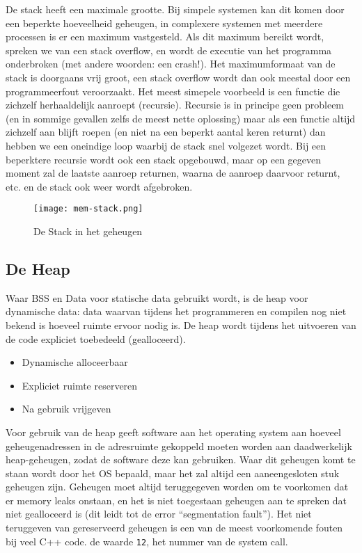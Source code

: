 De stack heeft een maximale grootte. Bij simpele systemen kan dit komen door een beperkte hoeveelheid geheugen, in complexere systemen met meerdere processen is er een maximum vastgesteld. Als dit maximum bereikt wordt, spreken we van een stack overflow, en wordt de executie van het programma onderbroken (met andere woorden: een crash!). Het maximumformaat van de stack is doorgaans vrij groot, een stack overflow wordt dan ook meestal door een programmeerfout veroorzaakt. Het meest simepele voorbeeld is een functie die zichzelf herhaaldelijk aanroept (recursie). Recursie is in principe geen probleem (en in sommige gevallen zelfs de meest nette oplossing) maar als een functie altijd zichzelf aan blijft roepen (en niet na een beperkt aantal keren returnt) dan hebben we een oneindige loop waarbij de stack snel volgezet wordt. Bij een beperktere recursie wordt ook een stack opgebouwd, maar op een gegeven moment zal de laatste aanroep returnen, waarna de aanroep daarvoor returnt, etc. en de stack ook weer wordt afgebroken.

\begin{figure}[ht]
    \centering
    \texttt{[image: mem-stack.png]}
    \caption{De Stack in het geheugen}
    \label{fig:stack}
\end{figure}

\subsection{De Heap}\label{de-heap}

Waar BSS en Data voor statische data gebruikt wordt, is de heap voor dynamische data: data waarvan tijdens het programmeren en compilen nog niet bekend is hoeveel ruimte ervoor nodig is. De heap wordt tijdens het uitvoeren van de code expliciet toebedeeld (gealloceerd).

\begin{itemize}
\tightlist
\item
  Dynamische alloceerbaar
\item
  Expliciet ruimte reserveren
\item
  Na gebruik vrijgeven
\end{itemize}

Voor gebruik van de heap geeft software aan het operating system aan hoeveel geheugenadressen in de adresruimte gekoppeld moeten worden aan daadwerkelijk heap-geheugen, zodat de software deze kan gebruiken. Waar dit geheugen komt te staan wordt door het OS bepaald, maar het zal altijd een aaneengesloten stuk geheugen zijn. Geheugen moet altijd teruggegeven worden om te voorkomen dat er memory leaks onstaan, en het is niet toegestaan geheugen aan te spreken dat niet gealloceerd is (dit leidt tot de error ``segmentation fault''). Het niet teruggeven van gereserveerd geheugen is een van de meest voorkomende fouten bij veel C++ code. de waarde \texttt{12}, het nummer van de system call.


